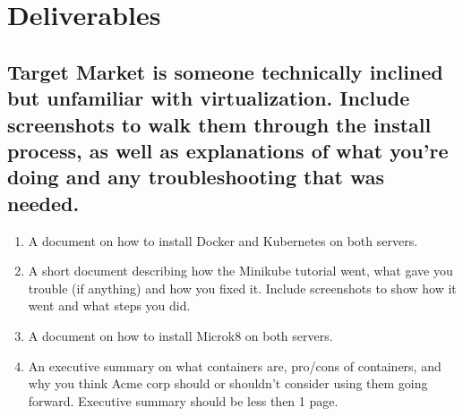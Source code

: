 \documentclass[12pt]{article}
\begin{document}
\section*{Deliverables}
\subsection*{Target Market is someone technically inclined but unfamiliar with virtualization. Include screenshots to walk them through the install process, as well as explanations of what you're doing and any troubleshooting that was needed.}
\begin{enumerate}
    \item A document on how to install Docker and Kubernetes on both servers.
    \item A short document describing how the Minikube tutorial went, what gave you trouble (if anything) and how you fixed it. Include screenshots to show how it went and what steps you did.
    \item A document on how to install Microk8 on both servers.
    \item An executive summary on what containers are, pro/cons of containers, and why you think Acme corp should or shouldn't consider using them going forward.  Executive summary should be less then 1 page. 
\end{enumerate}
\end{document}
